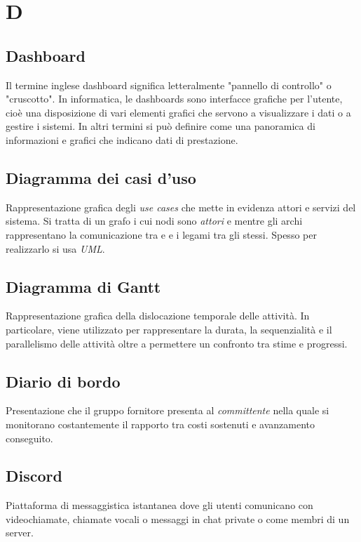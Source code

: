 \chapter{D}


\section{Dashboard}
Il termine inglese dashboard significa letteralmente "pannello di controllo" o "cruscotto". In informatica, le dashboards sono interfacce grafiche per l'utente, cioè una disposizione di vari elementi grafici che servono a visualizzare i dati o a gestire i sistemi. In altri termini si può definire come una panoramica di informazioni e grafici che indicano dati di prestazione.

\section{Diagramma dei casi d'uso}
Rappresentazione grafica degli \emph{use cases} che mette in evidenza attori e servizi del sistema. Si tratta di un grafo i cui nodi sono \emph{attori} e  mentre gli archi rappresentano la comunicazione tra  e  e i legami tra gli  stessi. Spesso per realizzarlo si usa \emph{UML}.

\section{Diagramma di Gantt}
Rappresentazione grafica della dislocazione temporale delle attività. In particolare, viene utilizzato per rappresentare la durata, la sequenzialità e il parallelismo delle attività oltre a permettere un confronto tra stime e progressi.

\section{Diario di bordo}
Presentazione che il gruppo fornitore presenta al \emph{committente} nella quale si monitorano costantemente il rapporto tra costi sostenuti e avanzamento conseguito.

\section{Discord}
Piattaforma di messaggistica istantanea dove gli utenti comunicano con videochiamate, chiamate vocali o messaggi in chat private o come membri di un server.